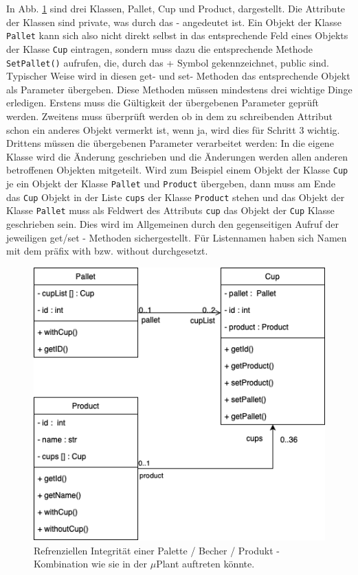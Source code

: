 In Abb. \ref{fig:figure9} sind drei Klassen, Pallet, Cup und Product, dargestellt.
Die Attribute der Klassen sind private, was durch das \glqq - \grqq angedeutet ist.
Ein Objekt der Klasse \verb|Pallet| kann sich also nicht direkt selbst in das entsprechende Feld eines Objekts der Klasse
\verb|Cup| eintragen, sondern muss dazu die entsprechende Methode \verb|SetPallet()| aufrufen, die, durch
das \glqq + \grqq Symbol gekennzeichnet, public sind.
Typischer Weise wird in diesen get- und set- Methoden das entsprechende Objekt als Parameter übergeben.
Diese Methoden müssen mindestens drei wichtige Dinge erledigen.
Erstens muss die Gültigkeit der übergebenen Parameter geprüft werden.
Zweitens muss überprüft werden ob in dem zu schreibenden Attribut schon ein anderes Objekt vermerkt ist, wenn ja, wird
dies für Schritt 3 wichtig.
Drittens müssen die übergebenen Parameter verarbeitet werden: In die eigene Klasse wird die Änderung geschrieben und
die Änderungen werden allen anderen betroffenen Objekten mitgeteilt.
Wird zum Beispiel einem Objekt der Klasse \verb|Cup| je ein Objekt der Klasse  \verb|Pallet| und \verb|Product|
übergeben, dann muss am Ende das \verb|Cup| Objekt in der Liste \verb|cups| der Klasse \verb|Product| stehen und das
Objekt der Klasse \verb|Pallet| muss als Feldwert des Attributs \verb|cup| das Objekt der \verb|Cup| Klasse geschrieben
sein.
Dies wird im Allgemeinen durch den gegenseitigen Aufruf der jeweiligen get/set - Methoden sichergestellt.
Für Listennamen haben sich Namen mit dem präfix with bzw. without durchgesetzt.

\vspace{1cm}
\begin{figure}
        \caption[Beispiel: Referenzielle Integrität]
        {\small Refrenziellen Integrität einer Palette / Becher / Produkt - Kombination wie sie in der $\mu$Plant
        auftreten könnte. }\label{fig:figure9}
        \includegraphics[width = \textwidth ]{Bilder/BeispielRefInt}
        \centering
\end{figure}

